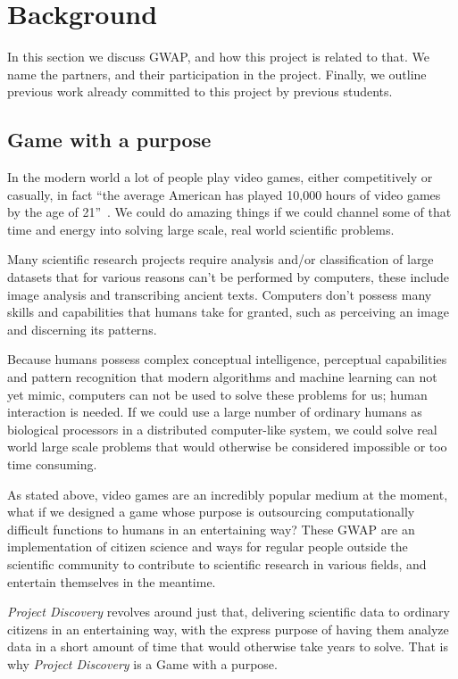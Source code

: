 \section{Background}\label{sec:background}
In this section we discuss GWAP\cite{GWAP}, and how this project is related to that. We name the partners, and their participation in the project. Finally, we outline previous work already committed to this project by previous students.

\subsection{Game with a purpose}
In the modern world a lot of people play video games, either competitively or casually, in fact ``the average American has played 10,000 hours of video games by the age of 21''~\cite{twitch}. We could do amazing things if we could channel some of that time and energy into solving large scale, real world scientific problems.

Many scientific research projects require analysis and/or classification of large datasets that for various reasons can't be performed by computers, these include image analysis and transcribing ancient texts. Computers don't possess many skills and capabilities that humans take for granted, such as perceiving an image and discerning its patterns.

Because humans possess complex conceptual intelligence, perceptual capabilities and pattern recognition that modern algorithms and machine learning can not yet mimic, computers can not be used to solve these problems for us; human interaction is needed. If we could use a large number of ordinary humans as biological processors in a distributed computer-like system, we could solve real world large scale problems that would otherwise be considered impossible or too time consuming.

As stated above, video games are an incredibly popular medium at the moment, what if we designed a game whose purpose is outsourcing computationally difficult functions to humans in an entertaining way? These GWAP are an implementation of citizen science and ways for regular people outside the scientific community to contribute to scientific research in various fields, and entertain themselves in the meantime.

\emph{Project Discovery} revolves around just that, delivering scientific data to ordinary citizens in an entertaining way, with the express purpose of having them analyze data in a short amount of time that would otherwise take years to solve. That is why \emph{Project Discovery} is a Game with a purpose.

